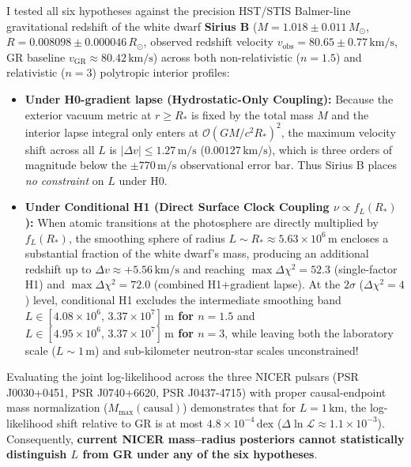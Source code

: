 \par
I tested all six hypotheses against the precision HST/STIS Balmer-line gravitational redshift of the white dwarf \textbf{Sirius B} ($M = 1.018 \pm 0.011\,M_\odot$, $R = 0.008098 \pm 0.000046\,R_\odot$, observed redshift velocity $v_{\text{obs}} = 80.65 \pm 0.77\,\text{km/s}$, GR baseline $v_{\text{GR}} \approx 80.42\,\text{km/s}$) across both non-relativistic ($n=1.5$) and relativistic ($n=3$) polytropic interior profiles:
\begin{itemize}\setlength{\itemsep}{1.5pt}\setlength{\parskip}{0pt}\setlength{\topsep}{1pt}
  \item \textbf{Under H0-gradient lapse (Hydrostatic-Only Coupling):} Because the exterior vacuum metric at $r \ge R_*$ is fixed by the total mass $M$ and the interior lapse integral only enters at $\mathcal{O}(GM/c^2 R_*)^2$, the maximum velocity shift across all $L$ is \textbf{$|\Delta v| \le 1.27\,\text{m/s}$} ($0.00127\,\text{km/s}$), which is three orders of magnitude below the $\pm 770\,\text{m/s}$ observational error bar. Thus Sirius B places \emph{no constraint} on $L$ under H0.
  \item \textbf{Under Conditional H1 (Direct Surface Clock Coupling $\nu \propto f_L(R_*)$):} When atomic transitions at the photosphere are directly multiplied by $f_L(R_*)$, the smoothing sphere of radius $L \sim R_* \approx 5.63\times 10^6\,\text{m}$ encloses a substantial fraction of the white dwarf's mass, producing an additional redshift up to $\Delta v \approx +5.56\,\text{km/s}$ and reaching \textbf{$\max\Delta\chi^2 = 52.3$} (single-factor H1) and \textbf{$\max\Delta\chi^2 = 72.0$} (combined H1+gradient lapse). At the $2\sigma$ ($\Delta\chi^2 = 4$) level, conditional H1 excludes the intermediate smoothing band \textbf{$L \in [4.08\times 10^6,\, 3.37\times 10^7]\,\text{m}$ for $n=1.5$} and \textbf{$L \in [4.95\times 10^6,\, 3.37\times 10^7]\,\text{m}$ for $n=3$}, while leaving both the laboratory scale ($L \sim 1\,\text{m}$) and sub-kilometer neutron-star scales unconstrained!
\end{itemize}

\par
Evaluating the joint log-likelihood across the three NICER pulsars (PSR J0030+0451, PSR J0740+6620, PSR J0437-4715) with proper causal-endpoint mass normalization ($M_{\text{max}}(\text{causal})$) demonstrates that for $L = 1\,\text{km}$, the log-likelihood shift relative to GR is at most \textbf{$4.8\times 10^{-4}\,\text{dex}$} ($\Delta\ln\mathcal{L} \approx 1.1\times 10^{-3}$). Consequently, \textbf{current NICER mass--radius posteriors cannot statistically distinguish $L$ from GR under any of the six hypotheses}.
\newpage

